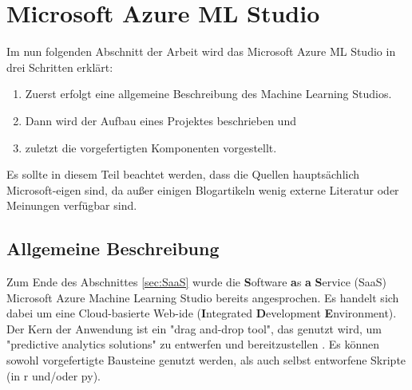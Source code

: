 \chapter{Microsoft Azure ML Studio}\label{sec:msmls}
Im nun folgenden Abschnitt der Arbeit wird das Microsoft Azure ML Studio in drei Schritten erklärt:
\begin{enumerate}
\item Zuerst erfolgt eine allgemeine Beschreibung des Machine Learning Studios.
\item Dann wird der Aufbau eines Projektes beschrieben und
\item zuletzt die vorgefertigten Komponenten vorgestellt.
\end{enumerate}
Es sollte in diesem Teil beachtet werden, dass die Quellen hauptsächlich Microsoft-eigen sind, da außer einigen Blogartikeln wenig externe Literatur oder Meinungen verfügbar sind.
\section{Allgemeine Beschreibung}\label{sec:ab1}
Zum Ende des Abschnittes \ref{sec:SaaS} wurde die \textbf{S}oftware \textbf{a}s \textbf{a} \textbf{S}ervice (SaaS) Microsoft Azure Machine Learning Studio bereits angesprochen. Es handelt sich dabei um eine Cloud-basierte Web-\gls{ide} (\textbf{I}ntegrated \textbf{D}evelopment \textbf{E}nvironment). Der Kern der Anwendung ist ein "drag and-drop tool", das genutzt wird, um "predictive analytics solutions" zu entwerfen und bereitzustellen \citep{ericson_what_2017}. Es können sowohl vorgefertigte Bausteine genutzt werden, als auch selbst entworfene Skripte (in \gls{r} und/oder \gls{py}).
